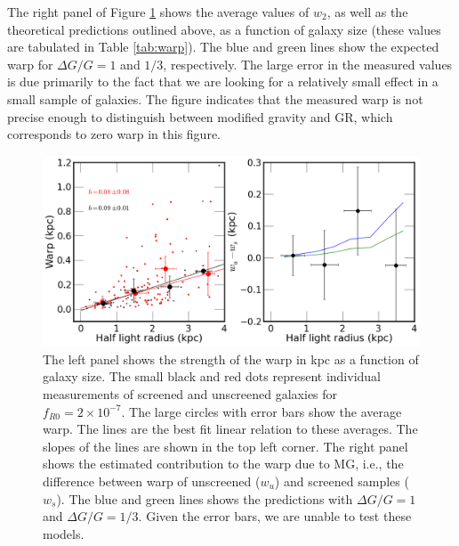 \documentclass{emulateapj}
\begin{document}
The right panel of Figure \ref{fig:size-warp-kpc} shows the average
values of $w_2$, as well as the theoretical predictions outlined
above, as a function of galaxy size (these values are tabulated
in Table \ref{tab:warp}).
The blue and green lines show the expected warp for $\Delta G/G
= 1$ and $1/3$, respectively.
The large error in the measured values
is due primarily to the fact that we are looking for a
relatively small effect in a small sample of galaxies.
The figure indicates that the measured warp is not precise enough to
distinguish between modified gravity and GR, which corresponds to zero
warp in this figure.


\begin{figure}
\begin{center}
\includegraphics[scale=0.43]{figures/size-warpness-kpc.png}
\caption{The left panel shows the strength of the warp in kpc as a function of
galaxy size. The small black and red dots
represent individual measurements of screened and unscreened galaxies for
$f_{R0} = 2 \times10^{-7}$. The large circles
with error bars show the average warp.  The
lines are the best fit linear relation to these averages. The slopes of
the lines are shown in the top left corner. The right panel shows the estimated
contribution to the warp due to MG, i.e., the difference between warp
of unscreened
($w_u$) and screened samples ($w_s$). The blue and green lines shows the
predictions with $\Delta G/G = 1$ and $\Delta G/G = 1/3$. Given the error
bars, we are unable to test these models. 
}
\label{fig:size-warp-kpc}
\end{center}
\end{figure}
\end{document}
